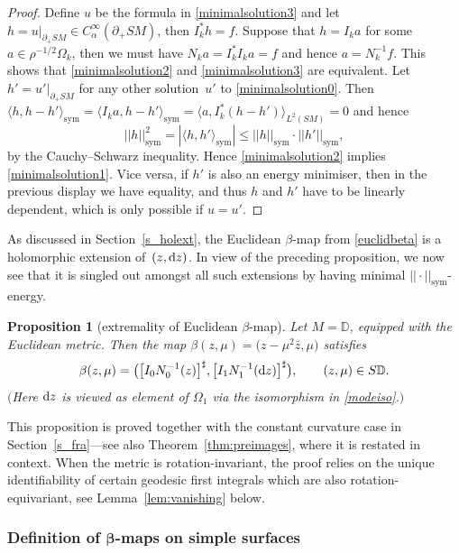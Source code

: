 \documentclass[10pt,a4paper]{amsart}
\numberwithin{equation}{section}
\newtheorem{Proposition}[Theorem]{Proposition}
\theoremstyle{definition}
\newcommand{\DD}{\mathbb{D}} %
\newcommand{\1}{{\bf 1}}
\begin{document}
\begin{proof}
Define $u$ be the formula in \ref{minimalsolution3} and let $h=u|_{\partial_+SM}\in C^\infty_\alpha(\partial_+SM)$, then $I_k^* h = f$. Suppose that $h=I_k a$ for some $a\in \rho^{-1/2}\Omega_k$, then we must have $N_k a = I_k^*I_k a = f$ and hence $a=N_k^{-1} f$. This shows that \ref{minimalsolution2} and \ref{minimalsolution3} are equivalent. Let $h'=u'|_{\partial_+SM}$ for any other solution~$u'$ to \eqref{minimalsolution0}. Then
$
	\langle h, h-h'\rangle_{\mathrm{sym}}=\langle I_k a, h-h'\rangle_{\mathrm{sym}}= \langle a, I_k^*(h-h')\rangle_{L^2(SM)}=0
$ and hence
\[
|| h ||_\mathrm{sym}^2 =|\langle h, h'\rangle_\mathrm{sym}| \le || h ||_\mathrm{sym}\cdot || h' ||_\mathrm{sym},
\]
by the Cauchy--Schwarz inequality. Hence
 \ref{minimalsolution2} implies \ref{minimalsolution1}. Vice versa, if $h'$ is also an energy minimiser, then in the previous display we have equality, and thus $h$ and $h'$ have to be linearly dependent, which is only possible if $u=u'$.
\end{proof}

As discussed in Section~\ref{s_holext}, the Euclidean $\beta$-map from \eqref{euclidbeta} is a holomorphic extension of~$(z,{\rm d}z)$. In view of the preceding proposition, we now see that it is singled out amongst all such extensions by having minimal $||\cdot||_\mathrm{sym}$-energy.

\begin{Proposition}[extremality of Euclidean $\beta$-map] \label{extramlbeta} Let $M=\DD$, equipped with the Euclidean metric. Then the map $\beta(z,\mu)=\bigl(z-\mu^2\bar z,\mu\bigr)$ satisfies
\[\beta(z,\mu)=\bigl(\big[I_{0}N_{0}^{-1}(z)\big]^{\sharp}, \big[I_{1}N_{1}^{-1}({\rm d}z)\big]^{\sharp}\bigr),\qquad (z,\mu)\in S\DD.\]
$($Here ${\rm d}z$ is viewed as element of $\Omega_1$ via the isomorphism in \eqref{modeiso}.$)$
\end{Proposition}

This proposition is proved together with the constant curvature case in Section~\ref{s_fra}---see also Theorem~\ref{thm:preimages}, where it is restated in context. When the metric is rotation-invariant, the proof relies on the unique identifiability of certain geodesic first integrals which are also rotation-equivariant, see Lemma~\ref{lem:vanishing} below.

\subsubsection[Definition of beta-maps on simple surfaces]{Definition of $\boldsymbol{\beta}$-maps on simple surfaces}
\end{document}
